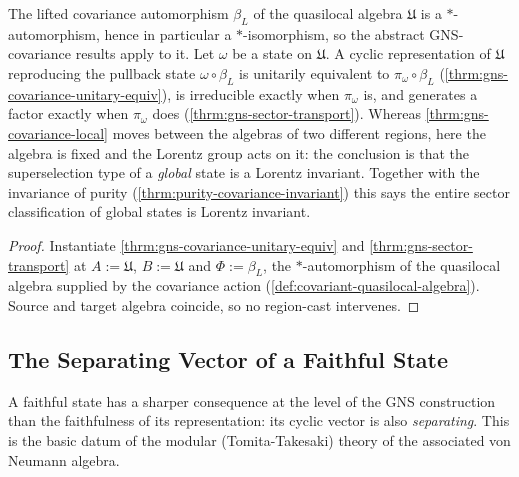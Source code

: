 \begin{theorem}
    \label{thrm:gns-covariance-quasilocal-action}
    \leanok
    The lifted covariance automorphism $\beta_L$ of the quasilocal algebra $\mathfrak{U}$ is a $*$-automorphism, hence in particular a $*$-isomorphism, so the abstract GNS-covariance results apply to it. Let $\omega$ be a state on $\mathfrak{U}$. A cyclic representation of $\mathfrak{U}$ reproducing the pullback state $\omega \circ \beta_L$ is unitarily equivalent to $\pi_\omega \circ \beta_L$ (\ref{thrm:gns-covariance-unitary-equiv}), is irreducible exactly when $\pi_\omega$ is, and generates a factor exactly when $\pi_\omega$ does (\ref{thrm:gns-sector-transport}). Whereas \ref{thrm:gns-covariance-local} moves between the algebras of two different regions, here the algebra is fixed and the Lorentz group acts on it: the conclusion is that the superselection type of a \emph{global} state is a Lorentz invariant. Together with the invariance of purity (\ref{thrm:purity-covariance-invariant}) this says the entire sector classification of global states is Lorentz invariant.
\end{theorem}
\begin{proof}
    \leanok
    Instantiate \ref{thrm:gns-covariance-unitary-equiv} and \ref{thrm:gns-sector-transport} at $A := \mathfrak{U}$, $B := \mathfrak{U}$ and $\Phi := \beta_L$, the $*$-automorphism of the quasilocal algebra supplied by the covariance action (\ref{def:covariant-quasilocal-algebra}). Source and target algebra coincide, so no region-cast intervenes.
\end{proof}

\subsection{The Separating Vector of a Faithful State}

A faithful state has a sharper consequence at the level of the GNS construction than the faithfulness of its representation: its cyclic vector is also \emph{separating}. This is the basic datum of the modular (Tomita-Takesaki) theory of the associated von Neumann algebra.

